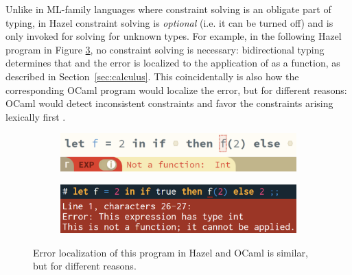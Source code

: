 Unlike in ML-family languages where constraint solving is an obligate part of typing, in Hazel constraint solving is \emph{optional} (i.e. it can be turned off) and is only invoked for solving for unknown types. For example, in the following Hazel program in Figure \ref{fig:localComparison}, no constraint solving is necessary: bidirectional typing determines that  and the error is localized to the application of  as a function, as described in Section~\ref{sec:calculus}. This coincidentally is also how the corresponding OCaml program would localize the error, but for different reasons: OCaml would detect inconsistent constraints and favor the constraints arising lexically first \cite{mcadam1998unification,DBLP:journals/tapos/OderskySW99,DBLP:conf/icfp/Pottier14}.


\begin{figure}[H]
\centering
\begin{subfigure}{.5\textwidth}
  \centering
  \includegraphics[width=0.9\linewidth]{images/localExCombined.png}
  \label{fig:hazelLocalEx}
\end{subfigure}%
\begin{subfigure}{.5\textwidth}
  \centering
  \includegraphics[width=0.9\linewidth]{images/ocamlEx.png}
  \label{fig:ocamlEx}
\end{subfigure}
\caption{Error localization of this program in Hazel and OCaml is similar, but for different reasons.}
\label{fig:localComparison}
\end{figure}


